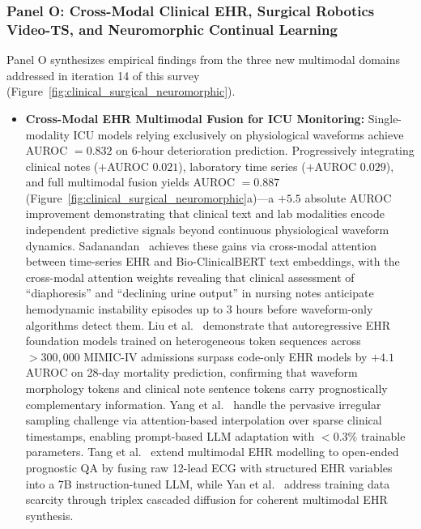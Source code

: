 \subsubsection{Panel O: Cross-Modal Clinical EHR, Surgical Robotics Video-TS, and Neuromorphic Continual Learning}
\label{sec:panel_o}

Panel O synthesizes empirical findings from the three new multimodal domains addressed in iteration 14 of this survey (Figure~\ref{fig:clinical_surgical_neuromorphic}).

\begin{itemize}
    \item \textbf{Cross-Modal EHR Multimodal Fusion for ICU Monitoring:} Single-modality ICU models relying exclusively on physiological waveforms achieve AUROC $= 0.832$ on 6-hour deterioration prediction. Progressively integrating clinical notes ($+$AUROC $0.021$), laboratory time series ($+$AUROC $0.029$), and full multimodal fusion yields AUROC $= 0.887$ (Figure~\ref{fig:clinical_surgical_neuromorphic}a)---a $+5.5$ absolute AUROC improvement demonstrating that clinical text and lab modalities encode independent predictive signals beyond continuous physiological waveform dynamics. Sadanandan~\cite{Sadanandan2026MultimodalICU} achieves these gains via cross-modal attention between time-series EHR and Bio-ClinicalBERT text embeddings, with the cross-modal attention weights revealing that clinical assessment of ``diaphoresis'' and ``declining urine output'' in nursing notes anticipate hemodynamic instability episodes up to 3 hours before waveform-only algorithms detect them. Liu et al.~\cite{Liu2026AutoregressiveEHR} demonstrate that autoregressive EHR foundation models trained on heterogeneous token sequences across $>300{,}000$ MIMIC-IV admissions surpass code-only EHR models by $+4.1$ AUROC on 28-day mortality prediction, confirming that waveform morphology tokens and clinical note sentence tokens carry prognostically complementary information. Yang et al.~\cite{Yang2026MultimodalIrregularEHR} handle the pervasive irregular sampling challenge via attention-based interpolation over sparse clinical timestamps, enabling prompt-based LLM adaptation with $<\!0.3\%$ trainable parameters. Tang et al.~\cite{Tang2026UniPACT} extend multimodal EHR modelling to open-ended prognostic QA by fusing raw 12-lead ECG with structured EHR variables into a 7B instruction-tuned LLM, while Yan et al.~\cite{Yan2025TCDiff} address training data scarcity through triplex cascaded diffusion for coherent multimodal EHR synthesis.


\end{itemize}
